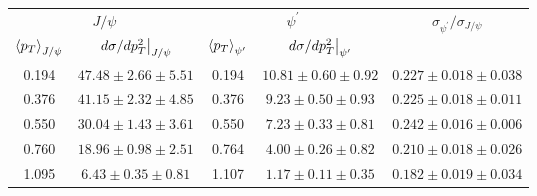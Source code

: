 \begin{tabular}{cc|cc|c}
\hline
\multicolumn{2}{c|}{$J/\psi$}                                 & \multicolumn{2}{c|}{$\psi^{\prime}$}                                 & \multirow{2}{*}{$\sigma_{\psi^\prime}/\sigma_{J/\psi}$} \\ \cline{1-4}
$\expval{p_T}_{J/\psi}$    & $\eval{d\sigma/dp^2_T}_{J/\psi}$ & $\expval{p_T}_{\psi^\prime}$ & $\eval{d\sigma/dp^2_T}_{\psi^\prime}$ &                                                         \\ \hline
\multicolumn{1}{c|}{0.194} & $47.48\pm2.66\pm5.51$            & \multicolumn{1}{c|}{0.194}   & $10.81\pm0.60\pm0.92$                 & $0.227\pm0.018\pm0.038$                                 \\
\multicolumn{1}{c|}{0.376} & $41.15\pm2.32\pm4.85$            & \multicolumn{1}{c|}{0.376}   & $9.23\pm0.50\pm0.93$                  & $0.225\pm0.018\pm0.011$                                 \\
\multicolumn{1}{c|}{0.550} & $30.04\pm1.43\pm3.61$            & \multicolumn{1}{c|}{0.550}   & $7.23\pm0.33\pm0.81$                  & $0.242\pm0.016\pm0.006$                                 \\
\multicolumn{1}{c|}{0.760} & $18.96\pm0.98\pm2.51$            & \multicolumn{1}{c|}{0.764}   & $4.00\pm0.26\pm0.82$                  & $0.210\pm0.018\pm0.026$                                 \\
\multicolumn{1}{c|}{1.095} & $6.43\pm0.35\pm0.81$             & \multicolumn{1}{c|}{1.107}   & $1.17\pm0.11\pm0.35$                  & $0.182\pm0.019\pm0.034$                                 \\ \hline
\end{tabular}
